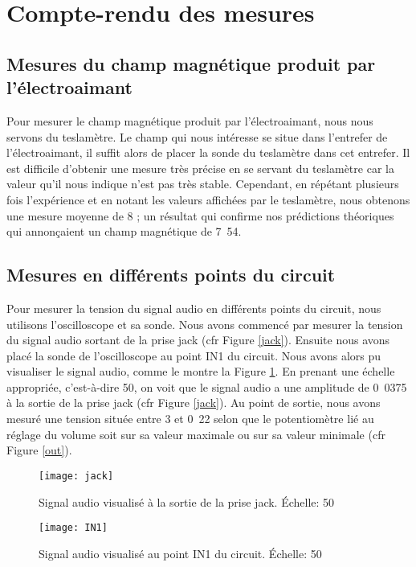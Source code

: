\section{Compte-rendu des mesures}

\subsection{Mesures du champ magnétique produit par l'électroaimant}
Pour mesurer le champ magnétique produit par l'électroaimant, nous nous servons du teslamètre.
Le champ qui nous intéresse se situe dans l'entrefer de l'électroaimant, il suffit alors de placer
la sonde du teslamètre dans cet entrefer. Il est difficile d'obtenir une mesure très précise en se
servant du teslamètre car la valeur qu'il nous indique n'est pas très stable. Cependant, en répétant
plusieurs fois l'expérience et en notant les valeurs affichées par le teslamètre, nous obtenons une mesure
moyenne de \unit{8}{\centi\tesla} ; un résultat qui confirme nos prédictions théoriques
qui annonçaient un champ magnétique de \unit{7.54}{\centi\tesla}.

\subsection{Mesures en différents points du circuit}
Pour mesurer la tension du signal audio en différents points du circuit, nous utilisons l'oscilloscope
et sa sonde.
Nous avons commencé par mesurer la tension du signal audio sortant de la prise jack (cfr Figure \ref{jack}). Ensuite nous avons
placé la sonde de l'oscilloscope au point IN1 du circuit. Nous avons alors pu visualiser le
signal audio, comme le montre la Figure \ref{in1}.
En prenant une échelle appropriée, c'est-à-dire \unit{50}{\milli\volt}, on voit que le signal
audio a une amplitude de \unit{0.0375}{\volt} à la sortie de la prise jack (cfr Figure \ref{jack}).
Au point de sortie, nous avons mesuré une tension située entre \unit{3}{\volt}
et \unit{0.22}{\volt} selon que le potentiomètre lié au réglage du volume
soit sur sa valeur maximale ou sur sa valeur minimale (cfr Figure \ref{out}).


\begin{figure}[h]
\begin{minipage}[c]{.45\linewidth}
\begin{center}
\texttt{[image: jack]}
\caption{Signal audio visualisé à la sortie de la prise jack. Échelle: \unit{50}{\milli\volt}}
\label{jack}
\end{center}
\end{minipage}
\hfill
\begin{minipage}[c]{.45\linewidth}
\begin{center}
\texttt{[image: IN1]}
\caption{Signal audio visualisé au point IN1 du circuit. Échelle: \unit{50}{\milli\volt}}
\label{in1}
\end{center}
\end{minipage}
\end{figure}


